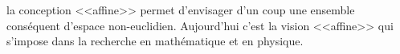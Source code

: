 la conception <<affine>> permet d'envisager d'un coup une ensemble conséquent d'espace non-euclidien. Aujourd'hui c'est la vision <<affine>> qui s'impose dans la recherche en mathématique et en physique.   


